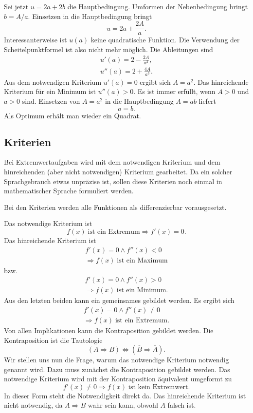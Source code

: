 \documentclass[a4paper,11pt,fleqn,twocolumn]{article}
\begin{document}
Sei jetzt \(u=2a+2b\) die Hauptbedingung. Umformen der Nebenbedingung
bringt \(b=A/a\). Einsetzen in die Hauptbedingung bringt
\[u=2a+\frac{2A}{a}.\]
Interessanterweise ist \(u(a)\) keine quadratische Funktion.
Die Verwendung der Scheitelpunktformel ist also nicht mehr möglich.
Die Ableitungen sind
\begin{gather*}
u'(a) = 2-\frac{2A}{a^2},\\
u''(a) = 2+\frac{4A}{a^3}.
\end{gather*}
Aus dem notwendigen Kriterium \(u'(a)=0\) ergibt sich
\(A=a^2\). Das hinreichende Kriterium für ein Minimum ist
\(u''(a)>0\). Es ist immer erfüllt, wenn \(A>0\) und \(a>0\) sind.
Einsetzen von \(A=a^2\) in die Hauptbedingung \(A=ab\) liefert
\[a=b.\]
Als Optimum erhält man wieder ein Quadrat.


\subsection*{Kriterien}

Bei Extremwertaufgaben wird mit dem notwendigen Kriterium und
dem hinreichenden (aber nicht notwendigen) Kriterium gearbeitet.
Da ein solcher Sprachgebrauch etwas unpräzise ist, sollen diese
Kriterien noch einmal in mathematischer Sprache formuliert werden.

Bei den Kriterien werden alle Funktionen als differenzierbar
vorausgesetzt.

Das notwendige Kriterium ist
\[f(x)\;\text{ist ein Extremum}\Rightarrow f'(x)=0.\]
Das hinreichende Kriterium ist
\begin{gather*}
f'(x)=0\wedge f''(x)<0\\
\Rightarrow f(x)\;\text{ist ein Maximum}
\end{gather*}
bzw.
\begin{gather*}
f'(x)=0\wedge f''(x)>0\\
\Rightarrow f(x)\;\text{ist ein Minimum}.
\end{gather*}
Aus den letzten beiden kann ein gemeinsames gebildet werden.
Es ergibt sich
\begin{gather*}
f'(x)=0\wedge f''(x)\ne 0\\
\Rightarrow f(x)\;\text{ist ein Extremum}.
\end{gather*}
Von allen Implikationen kann die Kontraposition gebildet werden.
Die Kontraposition ist die Tautologie
\[(A\Rightarrow B) \Leftrightarrow
(\overline B\Rightarrow\overline A).\]
Wir stellen uns nun die Frage, warum das notwendige Kriterium
{\glqq}notwendig{\grqq} genannt wird. Dazu muss zunächst die Kontraposition
gebildet werden. Das notwendige Kriterium wird mit der Kontraposition
äquivalent umgeformt zu
\[f'(x)\ne 0\Rightarrow f(x)\;\text{ist kein Extremwert}.\]
In dieser Form steht die Notwendigkeit direkt da.
Das hinreichende Kriterium ist nicht notwendig, da \(A\Rightarrow B\)
wahr sein kann, obwohl \(A\) falsch ist.
\end{document}

